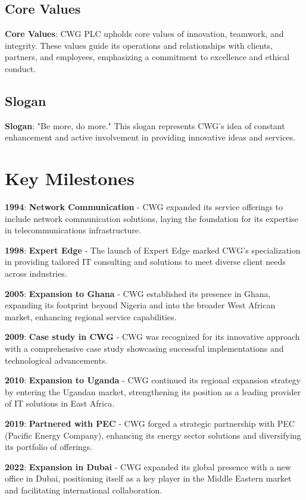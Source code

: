 \documentclass[a4paper,12pt]{report}
\begin{document}
	\subsection{Core Values}
	\textbf{Core Values}: CWG PLC upholds core values of innovation, teamwork, and integrity. These values guide its operations and relationships with clients, partners, and employees, emphasizing a commitment to excellence and ethical conduct.
	
	\subsection{Slogan}
	\textbf{Slogan}: "Be more, do more." This slogan represents CWG's idea of constant enhancement and active involvement in providing innovative ideas and services.
	
	\section{Key Milestones}
	
	\textbf{1994}: \textbf{Network Communication} - CWG expanded its service offerings to include network communication solutions, laying the foundation for its expertise in telecommunications infrastructure.
	
	\textbf{1998}: \textbf{Expert Edge} - The launch of Expert Edge marked CWG's specialization in providing tailored IT consulting and solutions to meet diverse client needs across industries.
	
	\textbf{2005}: \textbf{Expansion to Ghana} - CWG established its presence in Ghana, expanding its footprint beyond Nigeria and into the broader West African market, enhancing regional service capabilities.
	
	\textbf{2009}: \textbf{Case study in CWG} - CWG was recognized for its innovative approach with a comprehensive case study showcasing successful implementations and technological advancements.
	
	\textbf{2010}: \textbf{Expansion to Uganda} - CWG continued its regional expansion strategy by entering the Ugandan market, strengthening its position as a leading provider of IT solutions in East Africa.
	
	\textbf{2019}: \textbf{Partnered with PEC} - CWG forged a strategic partnership with PEC (Pacific Energy Company), enhancing its energy sector solutions and diversifying its portfolio of offerings.
	
	\textbf{2022}: \textbf{Expansion in Dubai} - CWG expanded its global presence with a new office in Dubai, positioning itself as a key player in the Middle Eastern market and facilitating international collaboration.
	
\end{document}
